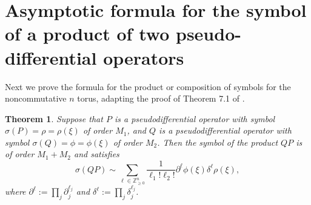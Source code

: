 \documentclass[10pt]{article}
\newtheorem{thm}{Theorem}[section]
\theoremstyle{remark}
\theoremstyle{definition}
\begin{document}
\section{Asymptotic formula for the symbol of a product
of two pseudo-differential operators}
Next we prove the formula for the product or composition of symbols
for the noncommutative $n$ torus, adapting the proof of
Theorem 7.1 of \cite{wong}.
\begin{thm}\label{prod}
Suppose that $P$ is a pseudodifferential operator with symbol
$\sigma(P)=\rho=\rho(\xi)$ of order $M_1$, and $Q$ is a pseudodifferential
operator with symbol $\sigma(Q)=\phi=\phi(\xi)$ of order $M_2$.
Then the symbol of the product $QP$ is of order $M_1+M_2$ and satisfies
$$\sigma(QP)\sim\sum_{\ell\in\mathbb Z_{\ge 0}^n}
\frac{1}{\ell_1!\ell_2!}\partial^{\ell}\phi(\xi)\delta^{\ell}\rho(\xi),$$
where $\partial^{\ell}:=\prod_j\partial_j^{\ell_j}$
and $\delta^{\ell}:=\prod_j\delta_j^{\ell_j}$.
\end{thm}
\end{document}
